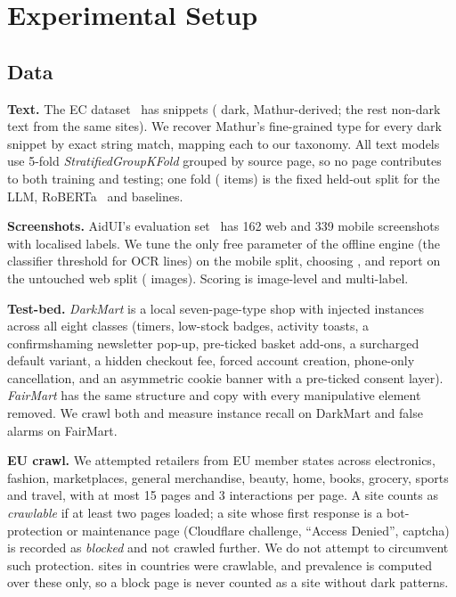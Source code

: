 \documentclass[conference]{IEEEtran}
\begin{document}
\section{Experimental Setup}
\subsection{Data}
\textbf{Text.} The EC dataset~\cite{yada2022} has \NText{} snippets (\NTextDark{} dark, Mathur-derived;
the rest non-dark text from the same sites). We recover Mathur's fine-grained type for every dark snippet
by exact string match, mapping each to our taxonomy. All text models use 5-fold
\emph{StratifiedGroupKFold} grouped by source page, so no page contributes to both training and testing;
one fold (\NHeld{} items) is the fixed held-out split for the LLM, RoBERTa~\cite{liu2019roberta} and
baselines.

\textbf{Screenshots.} AidUI's evaluation set~\cite{mansur2023} has 162 web and 339 mobile screenshots with
localised labels. We tune the only free parameter of the offline engine (the classifier threshold for OCR
lines) on the mobile split, choosing \TuneBest{}, and report on the untouched web split
(\NWeb{} images). Scoring is image-level and multi-label.

\textbf{Test-bed.} \emph{DarkMart} is a local seven-page-type shop with \TbN{} injected instances across all
eight classes (timers, low-stock badges, activity toasts, a confirmshaming newsletter pop-up, pre-ticked
basket add-ons, a surcharged default variant, a hidden checkout fee, forced account creation,
phone-only cancellation, and an asymmetric cookie banner with a pre-ticked consent layer).
\emph{FairMart} has the same structure and copy with every manipulative element removed. We crawl both and
measure instance recall on DarkMart and false alarms on FairMart.

\textbf{EU crawl.} We attempted \CrawlAttempted{} retailers from EU member states across electronics,
fashion, marketplaces, general merchandise, beauty, home, books, grocery, sports and travel, with at most 15
pages and 3 interactions per page. A site counts as \emph{crawlable} if at least two pages loaded; a site whose
first response is a bot-protection or maintenance page (Cloudflare challenge, ``Access Denied'', captcha) is
recorded as \emph{blocked} and not crawled further. We do not attempt to circumvent such protection.
\CrawlOK{} sites in \CrawlOKCountries{} countries were crawlable, and prevalence is computed over these only, so a
block page is never counted as a site without dark patterns.
\end{document}
